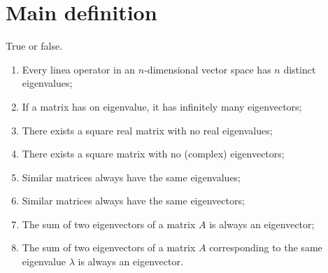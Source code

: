 \section{Main definition}
\begin{exercise}
  True or false.
  \begin{enumerate}[label={(\alph*)}]
    \item Every linea operator in an $n$-dimensional vector space
      has $n$ distinct eigenvalues;
    \item If a matrix has on eigenvalue, it has infinitely many
      eigenvectors;
    \item There exists a square real matrix with no real eigenvalues;
    \item There exists a square matrix with no (complex) eigenvectors;
    \item Similar matrices always have the same eigenvalues;
    \item Similar matrices always have the same eigenvectors;
    \item The sum of two eigenvectors of a matrix $A$ is always an
      eigenvector;
    \item The sum of two eigenvectors of a matrix $A$ corresponding
      to the same eigenvalue $\lambda$ is always an eigenvector.
  \end{enumerate}
\end{exercise}
